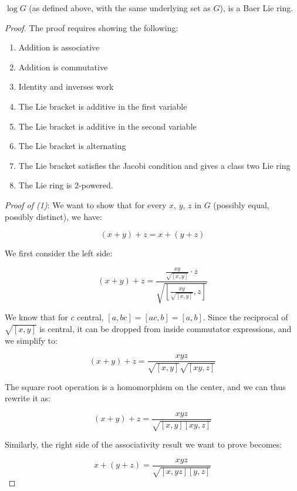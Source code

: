 \begin{lemma}
  $\log G$ (as defined above, with the same underlying set as $G$), is
  a Baer Lie ring.
\end{lemma}

\begin{proof}
  The proof requires showing the following:

  \begin{enumerate}
  \item Addition is associative
  \item Addition is commutative
  \item Identity and inverses work
  \item The Lie bracket is additive in the first variable
  \item The Lie bracket is additive in the second variable
  \item The Lie bracket is alternating
  \item The Lie bracket satisfies the Jacobi condition and gives a class two Lie ring
  \item The Lie ring is $2$-powered.
  \end{enumerate}
  
  {\em Proof of (1)}: We want to show that for every $x$, $y$, $z$ in
  $G$ (possibly equal, possibly distinct), we have:

  $$(x + y) + z = x + (y + z)$$

  We first consider the left side:

  $$(x + y) + z = \frac{\frac{xy}{\sqrt{[x,y]}} \cdot z}{\sqrt{\left[\frac{xy}{\sqrt{[x,y]}},z\right]}}$$

  We know that for $c$ central, $[a,bc] = [ac,b] = [a,b]$. Since the
  reciprocal of $\sqrt{[x,y]}$ is central, it can be dropped from
  inside commutator expressions, and we simplify to:

  $$(x + y) + z = \frac{xyz}{\sqrt{[x,y]}\sqrt{[xy,z]}}$$

  The square root operation is a homomorphism on the center, and we can thus rewrite it as:

  \begin{equation*}
    (x + y) + z = \frac{xyz}{\sqrt{[x,y][xy,z]}} \tag{$\dagger$}
  \end{equation*}

  Similarly, the right side of the associativity result we want to prove becomes:

  \begin{equation*}
    x + (y + z) = \frac{xyz}{\sqrt{[x,yz][y,z]}} \tag{$\dagger \dagger$} 
  \end{equation*}


\end{proof}
